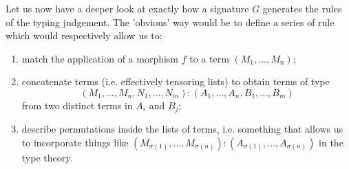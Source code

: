 \documentclass[pra,floatfix,
amsmath,superscriptaddress, 12pt]{article}
\theoremstyle{definition}
\begin{document}

Let us now have a deeper look at exactly how a signature $G$ generates the rules of the typing judgement. The 'obvious' way would be to define a series of rule which would respectively allow us to:
\begin{enumerate}
    \item match the application of a morphism $f$ to a term $(M_{1},\dots,M_{n})$;
    \item concatenate terms (i.e. effectively tensoring lists) to obtain terms of type $$\left(M_{1},\dots,M_{n},N_{1},\dots,N_{m}\right):\left(A_{1},\dots,A_{n},B_{1},\dots,B_{m}\right)$$ from two distinct terms in $A_i$ and $B_j$;
    \item describe permutations inside the lists of terms, i.e. something that allows us to incorporate things like $\left(M_{\sigma\left(1\right)},\dots,M_{\sigma\left(n\right)}\right):\left(A_{\sigma\left(1\right)},\dots,A_{\sigma\left(n\right)}\right)$ in the type theory.
\end{enumerate}




\end{document}
